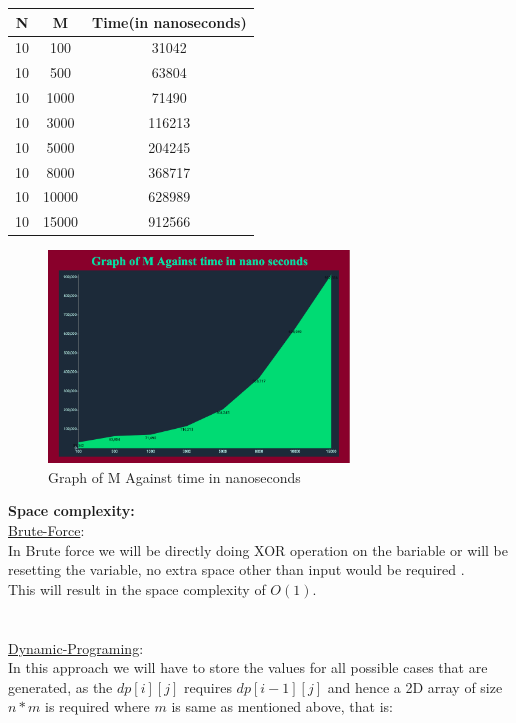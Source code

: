 \documentclass[conference]{IEEEtran}
\begin{document}
\begin{center}
 \begin{tabular}{||c| c| c||} 
 \hline
 N & M & Time(in nanoseconds) \\ [0.5ex] 
 \hline\hline
 10 & 100 & 31042  \\ 
 \hline
 10 & 500 & 63804  \\ 
 \hline
 10 & 1000 & 71490  \\ 
 \hline
 10 & 3000 & 116213  \\ 
 \hline
  10 & 5000 & 204245  \\ 
 \hline
  10 & 8000 & 368717  \\ 
 \hline
  10 & 10000 & 628989  \\ 
 \hline
  10 & 15000 & 912566  \\  [1ex] 
 \hline
\end{tabular}
\end{center}
\begin{figure}[h]
\caption{Graph of M Against time in nanoseconds\\}
\centering
\includegraphics[width=8cm]{images/graphm.png}
\end{figure}

\textbf{Space complexity:}\\
\underline{Brute-Force}:\\
In Brute force we will be directly doing XOR operation on the bariable or will be resetting the variable, no extra space other than input would be required .\\
This will result in the space complexity of $O(1)$. 
\\\\\\
\underline{Dynamic-Programing}:\\
In this  approach we will have to store the values for all possible cases that are generated, as the $dp[i][j]$ requires $dp[i-1][j]$ and hence a 2D array of size $n*m$ is required where $m$ is same as mentioned above, that is:\\
\end{document}
